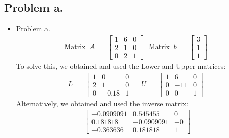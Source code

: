 \documentclass[12pt]{beamer}
\begin{document}
\subsection{Problem a.}
\begin{frame}
\begin{itemize}
\item Problem a.
\begin{equation*}
\textrm{Matrix }\ A =
\begin{matrix}
	\begin{bmatrix}
	1 & 6 & 0 \\ 2 & 1 & 0 \\ 0 & 2 & 1 
	\end{bmatrix}
\end{matrix}
\ \textrm{Matrix }\ b =
\begin{matrix}
	\begin{bmatrix}
	3 \\ 1 \\ 1 
	\end{bmatrix}
\end{matrix}
\end{equation*}
To solve this, we obtained and used the Lower and Upper matrices:
\begin{equation*}
L =
\begin{matrix}
	\begin{bmatrix}
	1 & 0 & 0 \\ 2 & 1 & 0 \\ 0 & -0.18 & 1 
	\end{bmatrix}
\end{matrix}
\ U =
\begin{matrix}
	\begin{bmatrix}
	1 & 6 & 0 \\ 0 & -11 & 0 \\ 0 & 0 & 1
	\end{bmatrix}
\end{matrix}
\end{equation*}
Alternatively, we obtained and used the inverse matrix:
\begin{equation*}
\begin{matrix}
	\begin{bmatrix}
	-0.0909091 & 0.545455 & 0\\	
	0.181818 & -0.0909091 & -0\\	
	-0.363636 &	0.181818 & 1
	\end{bmatrix}
\end{matrix}
\end{equation*}
\end{itemize}
\end{frame}
\end{document}
